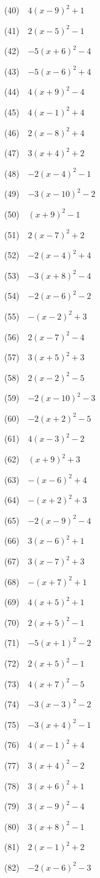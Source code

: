 \documentclass[a4j,twocolumn,10pt,fleqn]{jarticle}
\begin{document}
(40)~~$4(x-9)^2 +1$

(41)~~$2(x-5)^2-1$

(42)~~$-5(x +6)^2-4$

(43)~~$-5(x-6)^2 +4$

(44)~~$4(x +9)^2-4$

(45)~~$4(x-1)^2 +4$

(46)~~$2(x-8)^2 +4$

(47)~~$3(x +4)^2 +2$

(48)~~$-2(x-4)^2-1$

(49)~~$-3(x-10)^2-2$

(50)~~$(x +9)^2-1$

(51)~~$2(x-7)^2 +2$

(52)~~$-2(x-4)^2 +4$

(53)~~$-3(x +8)^2-4$

(54)~~$-2(x-6)^2-2$

(55)~~$-(x-2)^2 +3$

(56)~~$2(x-7)^2-4$

(57)~~$3(x +5)^2 +3$

(58)~~$2(x-2)^2-5$

(59)~~$-2(x-10)^2-3$

(60)~~$-2(x +2)^2-5$

(61)~~$4(x-3)^2-2$

(62)~~$(x +9)^2 +3$

(63)~~$-(x-6)^2 +4$

(64)~~$-(x +2)^2 +3$

(65)~~$-2(x-9)^2-4$

(66)~~$3(x-6)^2 +1$

(67)~~$3(x-7)^2 +3$

(68)~~$-(x +7)^2 +1$

(69)~~$4(x +5)^2 +1$

(70)~~$2(x +5)^2-1$

(71)~~$-5(x +1)^2-2$

(72)~~$2(x +5)^2-1$

(73)~~$4(x +7)^2-5$

(74)~~$-3(x-3)^2-2$

(75)~~$-3(x +4)^2-1$

(76)~~$4(x-1)^2 +4$

(77)~~$3(x +4)^2-2$

(78)~~$3(x +6)^2 +1$

(79)~~$3(x-9)^2-4$

(80)~~$3(x +8)^2-1$

(81)~~$2(x-1)^2 +2$

(82)~~$-2(x-6)^2-3$
\end{document}
